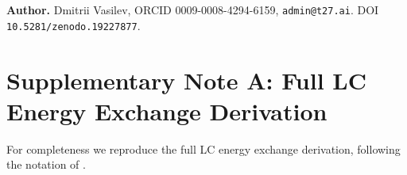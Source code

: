 \bigskip
\noindent\textbf{Author.} Dmitrii Vasilev, ORCID 0009-0008-4294-6159,
\texttt{admin@t27.ai}.
DOI \texttt{10.5281/zenodo.19227877}.


\section*{Supplementary Note A: Full LC Energy Exchange Derivation}
\label{sec:supp-a-w46}

For completeness we reproduce the full LC energy exchange derivation,
following the notation of \citep{cooke_ieee_2003}.


